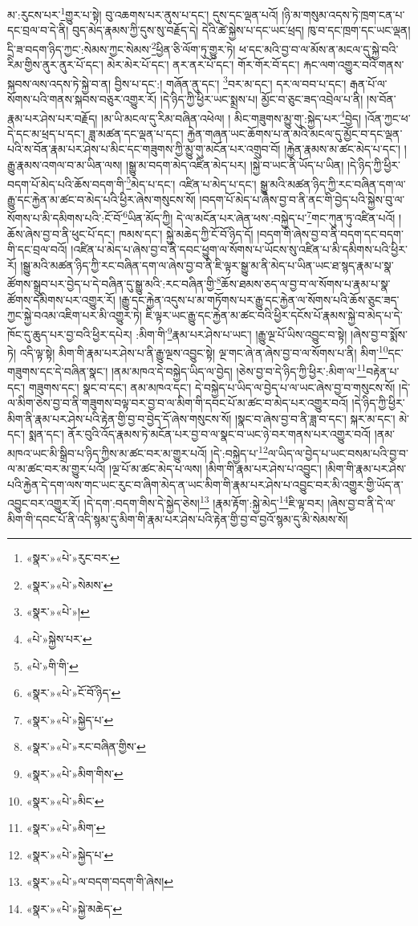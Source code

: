 མ་:རུངས་པར་\footnote{«སྣར་»«པེ་»རུང་བར་}གྱུར་པ་སྟེ། བུ་འཆགས་པར་ནུས་པ་དང་། དུས་དང་ལྡན་པའོ། །ཉི་མ་གསུམ་འདས་ཏེ་ཁྲག་ངན་པ་དང་བྲལ་བ་དེ་ནི། བུད་མེད་རྣམས་ཀྱི་དུས་སུ་བརྗོད་དེ། དེའི་ཚེ་སྐྱེས་པ་དང་ཡང་ཕྲད། ཁུ་བ་དང་ཁྲག་དང་ཡང་ལྡན། དྲི་ཟ་བདག་ཉིད་ཀྱང་:སེམས་ཀྱང་སེམས་\footnote{«སྣར་»«པེ་»སེམས་}ཕྱིན་ཅི་ལོག་ཏུ་གྱུར་ཏེ། ཕ་དང་མའི་བྱ་བ་ལ་མོས་ན་མངལ་དུ་སྐྱེ་བའི་རིམ་གྱིས་ནུར་ནུར་པོ་དང་། མེར་མེར་པོ་དང་། ནར་ནར་པོ་དང་། གོར་གོར་བོ་དང་། རྐང་ལག་འགྱུར་བའི་གནས་སྐབས་ལས་འདས་ཏེ་སྐྱེ་བ་ན། བྱིས་པ་དང་:། གཞོན་ནུ་དང་། \footnote{«སྣར་»«པེ་»།  }བར་མ་དང་། དར་ལ་བབ་པ་དང་། རྒན་པོ་ལ་སོགས་པའི་གནས་སྐབས་བཅུར་འགྱུར་རོ། །དེ་ཉིད་ཀྱི་ཕྱིར་ཡང་སྨྲས་པ། མྱོང་བ་ཅུང་ཟད་འབྲེལ་པ་ནི། །ས་བོན་རྣམ་པར་ཤེས་པར་བརྗོད། །མ་ཡི་མངལ་དུ་རིམ་བཞིན་འཕེལ། །
མིང་གཟུགས་མྱུ་གུ་:སྐྱེད་པར་\footnote{«པེ་»སྐྱེས་པར་}བྱེད། །འོན་ཀྱང་ཕ་དེ་དང་མ་ཕྲད་པ་དང་། ཟླ་མཚན་དང་ལྡན་པ་དང་། རྐྱེན་གཞན་ཡང་ཆོགས་པ་ན་མའི་མངལ་དུ་མྱོང་བ་དང་ལྡན་པའི་ས་བོན་རྣམ་པར་ཤེས་པ་མིང་དང་གཟུགས་ཀྱི་མྱུ་གུ་མངོན་པར་འགྲུབ་བོ། །རྐྱེན་རྣམས་མ་ཚང་མེད་པ་དང་། །རྒྱུ་རྣམས་འགལ་བ་མ་ཡིན་ལས། །སྒྱུ་མ་བདག་མེད་འཛིན་མེད་པར། །སྐྱེ་བ་ཡང་ནི་ཡོད་པ་ཡིན། །དེ་ཉིད་ཀྱི་ཕྱིར་བདག་པོ་མེད་པའི་ཆོས་བདག་གི་\footnote{«པེ་»གི་གི་}མེད་པ་དང་། འཛིན་པ་མེད་པ་དང་། སྒྱུ་མའི་མཚན་ཉིད་ཀྱི་རང་བཞིན་དག་ལ་རྒྱུ་དང་རྐྱེན་མ་ཚང་བ་མེད་པའི་ཕྱིར་ཞེས་གསུངས་སོ། །བདག་པོ་མེད་པ་ཞེས་བྱ་བ་ནི་ནང་གི་བྱེད་པའི་སྐྱེས་བུ་ལ་སོགས་པ་མི་དམིགས་པའི་:ངོ་བོ་\footnote{«སྣར་»«པེ་»ངོ་བོ་ཉིད་}ཡིན་མོད་ཀྱི། དེ་ལ་མངོན་པར་ཞེན་ཕས་:བསྐྱེད་པ་\footnote{«སྣར་»«པེ་»སྐྱེད་པ་}གང་ཀུན་ཏུ་འཛིན་པའོ། །ཆོས་ཞེས་བྱ་བ་ནི་ཕུང་པོ་དང་། ཁམས་དང་། སྐྱེ་མཆེད་ཀྱི་ངོ་བོ་ཉིད་དོ། །བདག་གི་ཞེས་བྱ་བ་ནི་བདག་དང་བདག་གི་དང་བྲལ་བའོ། །འཛིན་པ་མེད་པ་ཞེས་བྱ་བ་ནི་དབང་ཕྱུག་ལ་སོགས་པ་ཡོངས་སུ་འཛིན་པ་མི་དམིགས་པའི་ཕྱིར་རོ། །སྒྱུ་མའི་མཚན་ཉིད་ཀྱི་རང་བཞིན་དག་ལ་ཞེས་བྱ་བ་ནི་ཇི་ལྟར་སྒྱུ་མ་ནི་མེད་པ་ཡིན་ཡང་ཐ་སྙད་རྣམ་པ་སྣ་ཚོགས་སྒྲུབ་པར་བྱེད་པ་དེ་བཞིན་དུ་སྒྱུ་མའི་:རང་བཞིན་གྱི་\footnote{«སྣར་»«པེ་»རང་བཞིན་གྱིས་}ཆོས་ཐམས་ཅད་ལ་བྱ་བ་ལ་སོགས་པ་རྣམ་པ་སྣ་ཚོགས་དམིགས་པར་འགྱུར་རོ། །རྒྱུ་དང་རྐྱེན་འདུས་པ་མ་གཏོགས་པར་རྒྱུ་དང་རྐྱེན་ལ་སོགས་པའི་ཆོས་ཅུང་ཟད་ཀྱང་སྐྱེ་བའམ་འཇིག་པར་མི་འགྱུར་ཏེ། ཇི་ལྟར་ཡང་རྒྱུ་དང་རྐྱེན་མ་ཚང་བའི་ཕྱིར་དངོས་པོ་རྣམས་སྐྱེ་བ་མེད་པ་དེ་ཁོང་དུ་ཆུད་པར་བྱ་བའི་ཕྱིར་དཔེར། :མིག་གི་\footnote{«སྣར་»«པེ་»མིག་གིས་}རྣམ་པར་ཤེས་པ་ཡང་། །རྒྱུ་ལྔ་པོ་ཡིས་འབྱུང་བ་སྟེ། །ཞེས་བྱ་བ་སྨོས་ཏེ། འདི་ལྟ་སྟེ། མིག་གི་རྣམ་པར་ཤེས་པ་ནི་རྒྱུ་ལྔས་འབྱུང་སྟེ། ལྔ་གང་ཞེ་ན་ཞེས་བྱ་བ་ལ་སོགས་པ་ནི། མིག་\footnote{«སྣར་»«པེ་»མིང་}དང་གཟུགས་དང་དེ་བཞིན་སྣང་། །ནམ་མཁའ་དེ་བསྐྱེད་ཡིད་ལ་བྱེད། །ཅེས་བྱ་བ་དེ་ཉིད་ཀྱི་ཕྱིར་:མིག་ལ་\footnote{«སྣར་»«པེ་»མིག་}བརྟེན་པ་དང་། གཟུགས་དང་། སྣང་བ་དང་། ནམ་མཁའ་དང་། དེ་བསྐྱེད་པ་ཡིད་ལ་བྱེད་པ་ལ་ཡང་ཞེས་བྱ་བ་གསུངས་སོ། །དེ་ལ་མིག་ཅེས་བྱ་བ་ནི་གཟུགས་བལྟ་བར་བྱ་བ་ལ་མིག་གི་དབང་པོ་མ་ཚང་བ་མེད་པར་འགྱུར་བའོ། །དེ་ཉིད་ཀྱི་ཕྱིར་མིག་ནི་རྣམ་པར་ཤེས་པའི་རྟེན་གྱི་བྱ་བ་བྱེད་དོ་ཞེས་གསུངས་སོ། །སྣང་བ་ཞེས་བྱ་བ་ནི་ཟླ་བ་དང་། སྐར་མ་དང་། མེ་དང་། སྨན་དང་། ནོར་བུའི་འོད་རྣམས་ཏེ་མངོན་པར་བྱ་བ་ལ་སྣང་བ་ཡང་ཉེ་བར་གནས་པར་འགྱུར་བའོ། །ནམ་མཁའ་ཡང་མི་སྒྲིབ་པ་ཉིད་ཀྱིས་མ་ཚང་བར་མ་གྱུར་པའོ། །དེ་:བསྐྱེད་པ་\footnote{«སྣར་»«པེ་»སྐྱེད་པ་}ལ་ཡིད་ལ་བྱེད་པ་ཡང་བསམ་པའི་བྱ་བ་ལ་མ་ཚང་བར་མ་གྱུར་པའོ། །ལྔ་པོ་མ་ཚང་མེད་པ་ལས། །མིག་གི་རྣམ་པར་ཤེས་པ་འབྱུང་། །མིག་གི་རྣམ་པར་ཤེས་པའི་རྐྱེན་དེ་དག་ལས་གང་ཡང་རུང་བ་ཞིག་མེད་ན་ཡང་མིག་གི་རྣམ་པར་ཤེས་པ་འབྱུང་བར་མི་འགྱུར་གྱི་ཡོད་ན་འབྱུང་བར་འགྱུར་རོ། །དེ་དག་:བདག་གིས་དེ་སྐྱེད་ཅེས།\footnote{«སྣར་»«པེ་»ལ་བདག་བདག་གི་ཞེས།} །རྣམ་རྟོག་:སྐྱེ་མེད་\footnote{«སྣར་»«པེ་»སྐྱེ་མཆེད་}ཇི་ལྟ་བར། །ཞེས་བྱ་བ་ནི་དེ་ལ་མིག་གི་དབང་པོ་ནི་འདི་སྙམ་དུ་མིག་གི་རྣམ་པར་ཤེས་པའི་རྟེན་གྱི་བྱ་བ་བྱའོ་སྙམ་དུ་མི་སེམས་སོ། 
